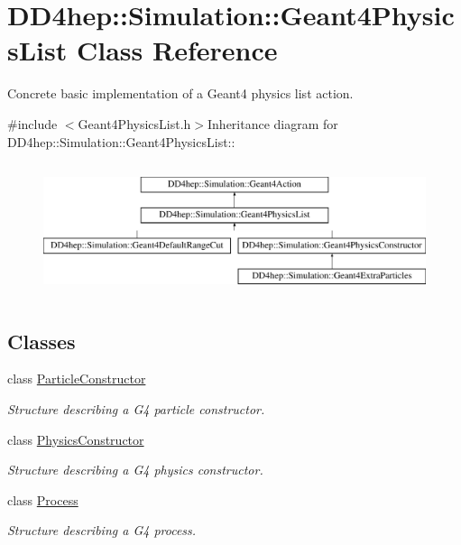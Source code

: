 \hypertarget{class_d_d4hep_1_1_simulation_1_1_geant4_physics_list}{
\section{DD4hep::Simulation::Geant4PhysicsList Class Reference}
\label{class_d_d4hep_1_1_simulation_1_1_geant4_physics_list}
}


Concrete basic implementation of a Geant4 physics list action.  


{\ttfamily \#include $<$Geant4PhysicsList.h$>$}Inheritance diagram for DD4hep::Simulation::Geant4PhysicsList::\begin{figure}[H]
\begin{center}
\leavevmode
\includegraphics[height=3.92982cm]{class_d_d4hep_1_1_simulation_1_1_geant4_physics_list}
\end{center}
\end{figure}
\subsection*{Classes}
\begin{DoxyCompactItemize}
\item 
class \hyperlink{class_d_d4hep_1_1_simulation_1_1_geant4_physics_list_1_1_particle_constructor}{ParticleConstructor}
\begin{DoxyCompactList}\small\item\em Structure describing a G4 particle constructor. \item\end{DoxyCompactList}\item 
class \hyperlink{class_d_d4hep_1_1_simulation_1_1_geant4_physics_list_1_1_physics_constructor}{PhysicsConstructor}
\begin{DoxyCompactList}\small\item\em Structure describing a G4 physics constructor. \item\end{DoxyCompactList}\item 
class \hyperlink{class_d_d4hep_1_1_simulation_1_1_geant4_physics_list_1_1_process}{Process}
\begin{DoxyCompactList}\small\item\em Structure describing a G4 process. \item\end{DoxyCompactList}\end{DoxyCompactItemize}
